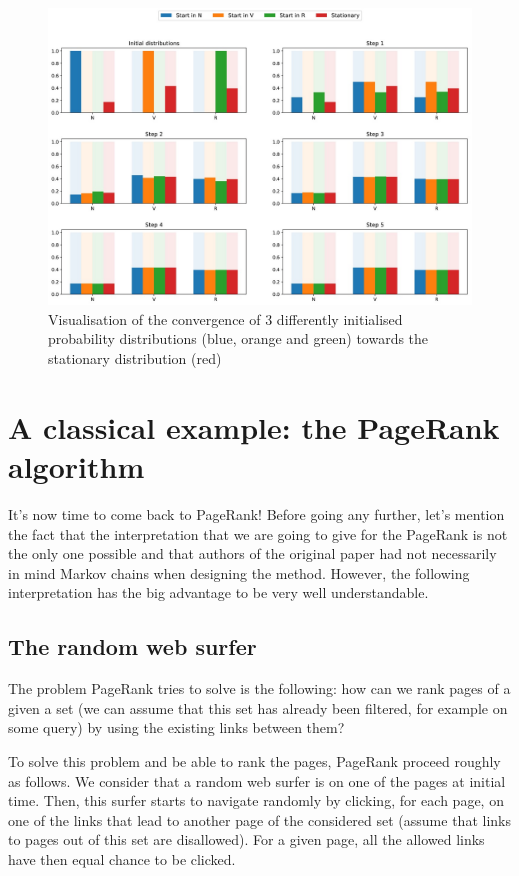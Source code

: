 \begin{figure}[h]
    \centering
\includegraphics[width=\textwidth]{pic/p05c06-snip09.png}
    \caption[Visualisation of convergence of probability distributions]{Visualisation of the convergence of 3 differently initialised probability distributions (blue, orange and green) towards the stationary distribution (red)}
    \label{fig:p05c06-snip09}
\end{figure}




\section{A classical example: the PageRank algorithm}

It's now time to come back to PageRank! Before going any further, let's mention the fact that the interpretation that we are going to give for the PageRank is not the only one possible and that authors of the original paper had not necessarily in mind Markov chains when designing the method. However, the following interpretation has the big advantage to be very well understandable.

\subsection{The random web surfer}

The problem PageRank tries to solve is the following: how can we rank pages of a given a set (we can assume that this set has already been filtered, for example on some query) by using the existing links between them?

To solve this problem and be able to rank the pages, PageRank proceed roughly as follows. We consider that a random web surfer is on one of the pages at initial time. Then, this surfer starts to navigate randomly by clicking, for each page, on one of the links that lead to another page of the considered set (assume that links to pages out of this set are disallowed). For a given page, all the allowed links have then equal chance to be clicked.

